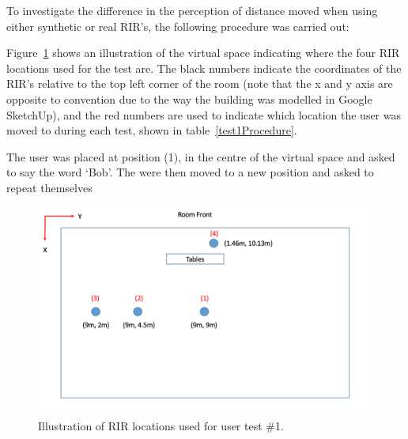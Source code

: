 \documentclass[../../main.tex]{subfiles}
\begin{document}
			To investigate the difference in the perception of distance moved when using either synthetic or real \ac{RIR}'s, the following procedure was carried out:

			Figure~\ref{test1Positions} shows an illustration of the virtual space indicating where the four \ac{RIR} locations used for the test are. The black numbers indicate the coordinates of the \ac{RIR}'s  relative to the top left corner of the room (note that the x and y axis are opposite to convention due to the way the building was modelled in Google SketchUp), and the red numbers are used to indicate which location the user was moved to during each test, shown in table~\ref{test1Procedure}.


			The user was placed at position (1), in the centre of the virtual space and asked to say the word `Bob'. The were then moved to a new position and asked to repeat themselves


			\begin{figure}[H]
				\centerline{\includegraphics[scale = 0.5]{Sections/userTesting/images/test1/roomPositions3.png}}
				\caption{Illustration of \ac{RIR} locations used for user test \#1.}
				\label{test1Positions}
			\end{figure}



			          
\end{document}

